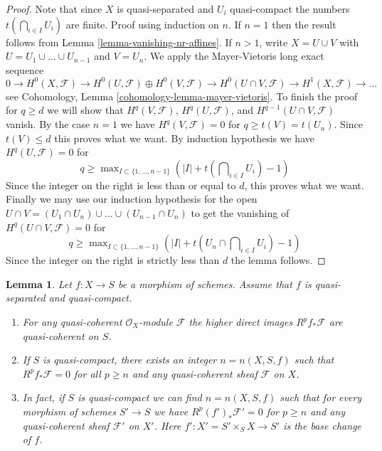 \documentclass{stacks-project}
\theoremstyle{plain}
\newtheorem{lemma}[subsection]{Lemma}
\theoremstyle{definition}
\theoremstyle{remark}
\numberwithin{equation}{subsection}
\begin{document}
\begin{proof}
Note that since $X$ is quasi-separated and $U_i$ quasi-compact the numbers
$t(\bigcap_{i \in I} U_i)$ are finite. Proof using induction on $n$.
If $n = 1$ then the result follows from Lemma \ref{lemma-vanishing-nr-affines}.
If $n > 1$, write $X = U \cup V$ with $U = U_1 \cup \ldots \cup U_{n - 1}$
and $V = U_n$. We apply the Mayer-Vietoris long exact sequence
$$
0 \to
H^0(X, \mathcal{F}) \to
H^0(U, \mathcal{F}) \oplus H^0(V, \mathcal{F}) \to
H^0(U \cap V, \mathcal{F}) \to
H^1(X, \mathcal{F}) \to \ldots
$$
see Cohomology, Lemma \ref{cohomology-lemma-mayer-vietoris}.
To finish the proof for $q \geq d$ we will show that
$H^q(V, \mathcal{F})$, $H^q(U, \mathcal{F})$, and
$H^{q - 1}(U \cap V, \mathcal{F})$ vanish.
By the case $n = 1$ we have $H^q(V, \mathcal{F}) = 0$ for
$q \geq t(V) = t(U_n)$. Since $t(V) \leq d$ this proves what we want.
By induction hypothesis we have $H^q(U, \mathcal{F}) = 0$ for
$$
q \geq \max\nolimits_{I \subset \{1, \ldots, n - 1\}}
\left(|I| + t(\bigcap\nolimits_{i \in I} U_i) - 1\right)
$$
Since the integer on the right is less than or equal to $d$, this
proves what we want. Finally we may use our induction hypothesis for the open
$U \cap V = (U_1 \cap U_n) \cup \ldots \cup (U_{n - 1} \cap U_n)$ to get
the vanishing of $H^q(U \cap V, \mathcal{F}) = 0$ for
$$
q \geq \max\nolimits_{I \subset \{1, \ldots, n - 1\}}
\left(|I| + t(U_n \cap \bigcap\nolimits_{i \in I} U_i) - 1\right)
$$
Since the integer on the right is strictly less than $d$
the lemma follows.
\end{proof}

\begin{lemma}
\label{lemma-quasi-coherence-higher-direct-images}
Let $f : X \to S$ be a morphism of schemes.
Assume that $f$ is quasi-separated and quasi-compact.
\begin{enumerate}
\item For any quasi-coherent $\mathcal{O}_X$-module $\mathcal{F}$ the
higher direct images $R^pf_*\mathcal{F}$ are quasi-coherent on $S$.
\item If $S$ is quasi-compact, there exists an integer $n = n(X, S, f)$
such that $R^pf_*\mathcal{F} = 0$ for all $p \geq n$ and any
quasi-coherent sheaf $\mathcal{F}$ on $X$.
\item In fact, if $S$ is quasi-compact we can find $n = n(X, S, f)$
such that for every
morphism of schemes $S' \to S$ we have $R^p(f')_*\mathcal{F}' = 0$
for $p \geq n$ and any quasi-coherent sheaf $\mathcal{F}'$
on $X'$. Here $f' : X' = S' \times_S X \to S'$ is the base change of $f$.
\end{enumerate}
\end{lemma}
\end{document}
